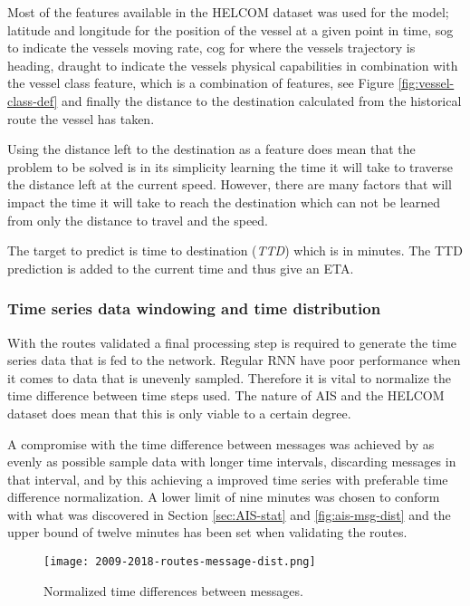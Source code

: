 \documentclass[../main.tex]{subfiles}
\begin{document}
Most of the features available in the HELCOM dataset was used for the model; latitude and longitude for the position of the vessel at a given point in time, sog to indicate the vessels moving rate, cog for where the vessels trajectory is heading, draught to indicate the vessels physical capabilities in combination with the vessel class feature, which is a combination of features, see Figure \ref{fig:vessel-class-def} and finally the distance to the destination calculated from the historical route the vessel has taken.

Using the distance left to the destination as a feature does mean that the problem to be solved is in its simplicity learning the time it will take to traverse the distance left at the current speed. However, there are many factors that will impact the time it will take to reach the destination which can not be learned from only the distance to travel and the speed.

The target to predict is time to destination (\textit{TTD}) which is in minutes. The TTD prediction is added to the current time and thus give an ETA.

\subsubsection{Time series data windowing and time distribution}
\label{sec:timeseries}

With the routes validated a final processing step is required to generate the time series data that is fed to the network. Regular RNN have poor performance when it comes to data that is unevenly sampled. Therefore it is vital to normalize the time difference between time steps used. The nature of AIS and the HELCOM dataset does mean that this is only viable to a certain degree.

A compromise with the time difference between messages was achieved by as evenly as possible sample data with longer time intervals, discarding messages in that interval, and by this achieving a improved time series with preferable time difference normalization. A lower limit of nine minutes was chosen to conform with what was discovered in Section \ref{sec:AIS-stat} and \ref{fig:ais-msg-dist} and the upper bound of twelve minutes has been set when validating the routes.

\begin{figure}[H]
	\centering
	\texttt{[image: 2009-2018-routes-message-dist.png]}
	\caption{Normalized time differences between messages.}
	\label{fig:norm-time}
\end{figure}
\end{document}
